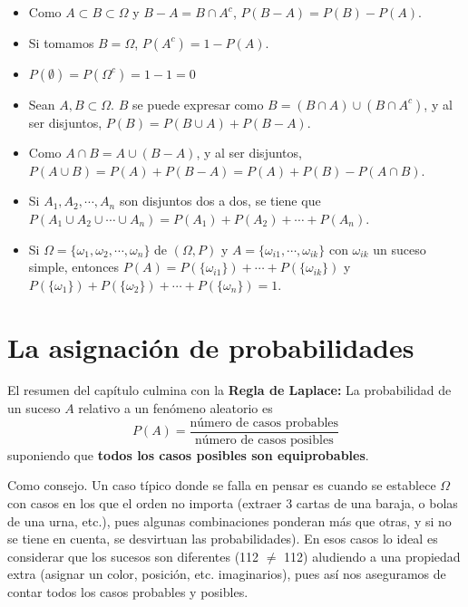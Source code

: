 \documentclass[a4paper, 11pt]{extarticle}
\begin{document}
\begin{multicols*}{2}
\begin{itemize}
\item Como \(A \subset B \subset \Omega\) y \(B - A = B \cap A^c\), \(P(B-A) =
  P(B) - P(A)\).
\item Si tomamos \(B = \Omega\), \(P(A^c) = 1 - P(A)\).
\item \(P(\emptyset) = P(\Omega^c) = 1 - 1 = 0\)
\item Sean \(A, B \subset \Omega\). \(B\) se puede expresar como \(B = (B \cap
  A) \cup (B \cap A^c)\), y al ser disjuntos, \(P(B) = P(B \cup A) + P(B - A)\).
\item Como \(A \cap B = A \cup (B - A)\), y al ser disjuntos, \(P(A \cup B) =
  P(A) + P(B-A) = P(A) + P(B) - P(A \cap B)\).
\item Si \(A_1, A_2, \cdots, A_n\) son disjuntos dos a dos, se tiene que \(P(A_1
  \cup A_2 \cup \cdots \cup A_n) = P(A_1) + P(A_2) + \cdots + P(A_n)\).
\item Si \(\Omega = \{ \omega_1,\omega_2, \cdots, \omega_n \}\) de \((\Omega, P)\) y \(A = \{ \omega_{i1}, \cdots, \omega_{ik} \}\) con \(\omega_{ik}\) un
suceso simple, entonces \(P(A) = P(\{ \omega_{i1} \}) + \cdots + P(\{ \omega_{ik}
  \})\) y \(P(\{ \omega_1 \}) + P(\{ \omega_2 \}) + \cdots + P(\{ \omega_n
  \}) = 1\).
\end{itemize}

\end{multicols*}



\section*{La asignación de probabilidades}
\label{sec:org5d1ee0e}
\vspace{-1.5em}
\begin{multicols*}{2}
\vspace{-1.5em}

El resumen del capítulo culmina con la \textbf{Regla de Laplace:}
La probabilidad de un suceso \(A\) relativo a un fenómeno aleatorio es
\[ P(A) = \frac{\text{número de casos probables}}{\text{número de casos
posibles}} \]
suponiendo que \textbf{todos los casos posibles son equiprobables}.

Como consejo. Un caso típico donde se falla en pensar es cuando se establece 
\(\Omega\) con casos en los que el orden no importa (extraer 3 cartas de una
baraja, o bolas de una urna, etc.), pues algunas combinaciones ponderan más
que otras, y si no se tiene en cuenta, se desvirtuan las probabilidades). En
esos casos lo ideal es considerar que los sucesos son diferentes (112 \(\neq\) 112) aludiendo a una propiedad extra (asignar un color, posición, etc.
imaginarios), pues así nos aseguramos de contar todos los casos probables y
posibles.  
\end{multicols*}
\pagebreak
\end{document}
